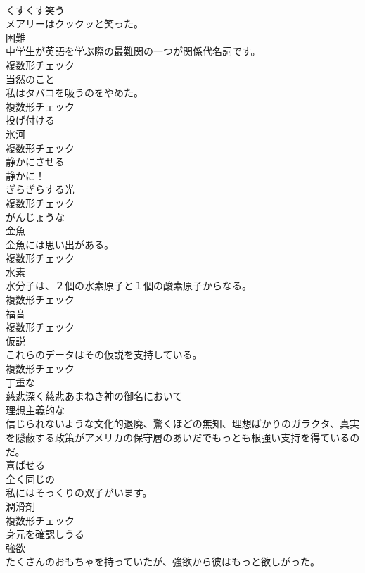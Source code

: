 \documentclass[8pt]{extreport}
\begin{document}
\begin{CJK}{UTF8}{min}
\\	[動詞]	くすくす笑う	
\\	メアリーはクックッと笑った。	
\\	[名詞]	困難	
\\	中学生が英語を学ぶ際の最難関の一つが関係代名詞です。	
\\	複数形チェック
\\	[名詞]	当然のこと	
\\	私はタバコを吸うのをやめた。	
\\	複数形チェック
\\	[動詞]	投げ付ける	
\\	[名詞]	氷河	
\\	複数形チェック
\\	[動詞]	静かにさせる	
\\	静かに！	
\\	[名詞]	ぎらぎらする光	
\\	複数形チェック
\\	[形容詞]	がんじょうな	
\\	[名詞]	金魚	
\\	金魚には思い出がある。	
\\	複数形チェック
\\	[名詞]	水素	
\\	水分子は、２個の水素原子と１個の酸素原子からなる。	
\\	複数形チェック
\\	[名詞]	福音	
\\	複数形チェック
\\	[名詞]	仮説	
\\	これらのデータはその仮説を支持している。	
\\	複数形チェック
\\	[形容詞]	丁重な	
\\	慈悲深く慈悲あまねき神の御名において	
\\	[形容詞]	理想主義的な	
\\	信じられないような文化的退廃、驚くほどの無知、理想ばかりのガラクタ、真実を隠蔽する政策がアメリカの保守層のあいだでもっとも根強い支持を得ているのだ。	
\\	[動詞]	喜ばせる	
\\	[形容詞]	全く同じの	
\\	私にはそっくりの双子がいます。	
\\	[名詞]	潤滑剤	
\\	複数形チェック
\\	[形容詞]	身元を確認しうる	
\\	[名詞]	強欲	
\\	たくさんのおもちゃを持っていたが、強欲から彼はもっと欲しがった。	

\end{CJK}
\end{document}
